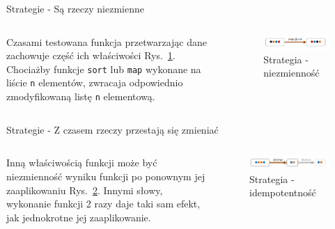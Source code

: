 \documentclass[polish,aspectratio=169]{beamer}
\newcommand{\refrys}[1]{Rys.~\ref{#1}}
\begin{document}
\begin{frame}{Strategie - Są rzeczy niezmienne}
    \begin{columns}[t]
            Czasami testowana funkcja przetwarzając dane zachowuje część ich właściwości \refrys{fig:invariant_strategy}.
            Chociażby funkcje \texttt{sort} lub \texttt{map} wykonane na liście \texttt{n} elementów, zwracaja odpowiednio zmodyfikowaną listę \texttt{n} elementową.
        \centering
        \begin{figure}
            \centering
            \includegraphics[width=1\textwidth]{images/property_invariant.png}
            \caption{Strategia - niezmienność}
            \label{fig:invariant_strategy}
        \end{figure}    
    \end{columns}
\end{frame}


\begin{frame}{Strategie - Z czasem rzeczy przestają się zmieniać}
    \begin{columns}[t]
            Inną właściwością funkcji może być niezmienność wyniku funkcji po ponownym jej zaaplikowaniu \refrys{fig:independance_strategy}. 
            Innymi słowy, wykonanie funkcji 2 razy daje taki sam efekt, jak jednokrotne jej zaaplikowanie.
        \centering
        \begin{figure}
            \centering
            \includegraphics[width=1\textwidth]{images/property_idempotence.png}
            \caption{Strategia - idempotentność}
            \label{fig:independance_strategy}
        \end{figure}    
    \end{columns}
\end{frame}
\end{document}
